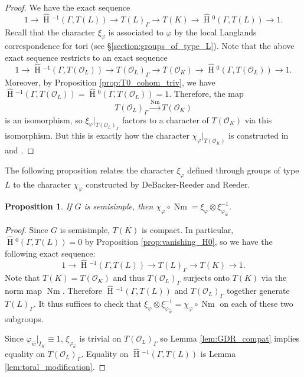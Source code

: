 \documentclass{amsart}
\theoremstyle{plain}
\newtheorem{proposition}[theorem]{Proposition}
\newcommand{\HT}[1]{\hat{\HH}{}^{#1}}
\theoremstyle{definition}
\numberwithin{equation}{section}
\DeclareMathOperator{\HH}{H}
\DeclareMathOperator{\Nm}{Nm}
\newcommand{\OK}{\mathcal{O}_K}
\newcommand{\OL}{\mathcal{O}_L}
\begin{document}
\begin{proof}
We have the exact sequence
$$1 \rightarrow \HT{-1}(\Gamma, T(L)) \rightarrow T(L)_{\Gamma} \rightarrow T(K)
  \rightarrow \HT{0}(\Gamma, T(L)) \rightarrow 1.$$
Recall that the character $\xi_{\varphi}$ is associated to $\varphi$ by
the local Langlands correspondence for tori (see \S\ref{section:groups_of_type_L}).
Note that the above exact sequence restricts to an exact sequence
$$1 \rightarrow \HT{-1}(\Gamma, T(\OL)) \rightarrow T(\OL)_{\Gamma}
  \rightarrow T(\OK) \rightarrow \HT{0}(\Gamma, T(\OL)) \rightarrow 1.$$
Moreover, by Proposition \ref{prop:T0_cohom_triv}, we have
$\HT{-1}(\Gamma, T(\OL)) = \HT{0}(\Gamma, T(\OL)) = 1$.
Therefore, the map
$$T(\OL)_{\Gamma} \xrightarrow{\Nm} T(\OK)$$
is an isomorphism, so
$\xi_{\varphi}|_{T(\OL)_{\Gamma}}$ factors to a character of
$T(\OK)$ via this isomorphism.  But this is exactly how the character
$\chi_{\varphi}|_{T(\OK)}$ is constructed in \cite{reeder-debacker:09a} and \cite{reeder:08a}.
\end{proof}

The following proposition relates the character $\xi_\varphi$ defined through groups of type $L$
to the character $\chi_\varphi$ constructed by DeBacker-Reeder and Reeder.

\begin{proposition}\label{prop:existenceofrectifier}
If $G$ is semisimple, then $\chi_{\varphi} \circ \Nm = \xi_{\varphi} \otimes \xi_{\varphi_{\hat{w}}}^{-1}$.
\end{proposition}

\begin{proof}
Since $G$ is semisimple, $T(K)$ is compact.  In particular,
$\HT{0}(\Gamma, T(L)) = 0$ by Proposition \ref{prop:vanishing_H0},
so we have the following exact sequence:
$$1 \rightarrow \HT{-1}(\Gamma, T(L)) \rightarrow T(L)_{\Gamma} \rightarrow T(K) \rightarrow 1.$$
Note that $T(K) = T(\OK)$ and thus
$T(\OL)_{\Gamma}$ surjects onto $T(K)$ via the norm map
$\Nm$.  Therefore $\HT{-1}(\Gamma,T(L))$ and
$T(\OL)_{\Gamma}$ together generate $T(L)_{\Gamma}$.  It thus suffices to check that
$\xi_{\varphi} \otimes \xi_{\varphi_{\hat{w}}}^{-1} = \chi_{\varphi} \circ \Nm$
on each of these two subgroups.

Since $\varphi_{\hat{w}}|_{I_K} \equiv 1$, $\xi_{\varphi_{\hat{w}}}$ is trivial on
$T(\OL)_{\Gamma}$ so Lemma
\ref{lem:GDR_compat} implies equality on $T(\OL)_{\Gamma}$.
Equality on $\HT{-1}(\Gamma,T(L))$ is Lemma \ref{lem:toral_modification}.
\end{proof}
\end{document}
